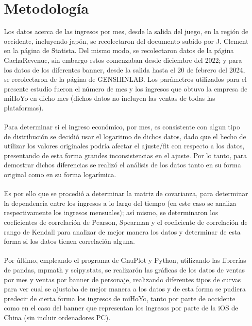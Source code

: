 \documentclass[osajnl,twocolumn,showpacs,superscriptaddress,10pt]{revtex4-2}
\begin{document}
\section{Metodología}
Los datos acerca de las ingresos por mes, desde la salida del juego, en la región de occidente, incluyendo japón, se recolectaron del documento subido por J. Clement en  la página de Statista. Del mismo modo, se recolectaron datos de la página GachaRevenue, sin embargo estos comenzaban desde diciembre del 2022; y para los datos de los diferentes banner, desde la salida hasta el 20 de febrero del 2024, se recolectaron de la página de GENSHINLAB. Los parámetros utilizados para el presente estudio fueron el número de mes y los ingresos que obtuvo la empresa de miHoYo en dicho mes (dichos datos no incluyen las ventas de todas las plataformas).
\\\\
Para determinar si el ingreso económico, por mes, es consistente con algun tipo de distribución se decidió usar el logaritmo de dichos datos, dado que el hecho de utilizar los valores originales podría afectar el ajuste/fit con respecto a los datos, presentando de esta forma grandes inconsistencias en el ajuste. Por lo tanto, para demostrar dichos diferencias se realizó el análisis de los datos tanto en su forma original como en su forma logarímica.
\\\\
Es por ello que se procedió a determinar la matriz de covarianza, para determinar la dependencia entre los ingresos a lo largo del tiempo (en este caso se analiza respectivamente los ingresos mensuales); así mismo, se determinaron los coeficientes de correlación de Pearson, Spearman y el coeficiente de correlación de rango de Kendall para analizar de mejor manera los datos y determinar de esta forma si los datos tienen correlación alguna.
\\\\
Por último, empleando el programa de GnuPlot y Python, utilizando las librerías de pandas, mpmath y scipy.stats, se realizarón las gráficas de los datos de ventas por mes y ventas por banner de personaje, realizando diferentes tipos de curvas para ver cual se ajustaba de mejor manera a los datos y de esta forma se pudiera predecir de cierta forma los ingresos de miHoYo, tanto por parte de occidente como en el caso del banner que representan los ingresos por parte de la iOS de China (sin incluir ordenadores PC).
\end{document}

